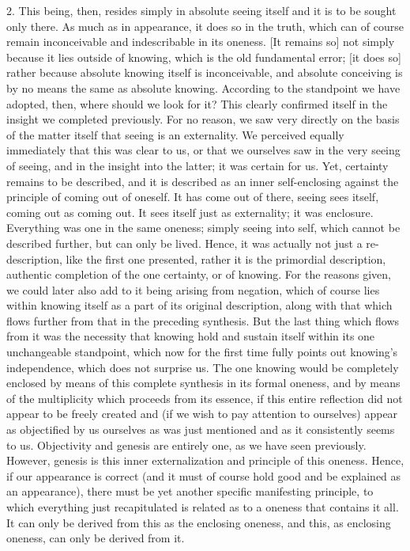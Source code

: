 2. This being, then, resides simply
in absolute seeing itself
and it is to be sought only there.
As much as in appearance,
it does so in the truth,
which can of course remain
inconceivable and indescribable
in its oneness.
[It remains so] not simply because
it lies outside of knowing,
which is the old fundamental error;
[it does so] rather because
absolute knowing itself is inconceivable,
and absolute conceiving is by no means
the same as absolute knowing.
According to the standpoint we have adopted, then,
where should we look for it?
This clearly confirmed itself
in the insight we completed previously.
For no reason, we saw very directly
on the basis of the matter itself
that seeing is an externality.
We perceived equally immediately
that this was clear to us,
or that we ourselves saw
in the very seeing of seeing,
and in the insight into the latter;
it was certain for us.
Yet, certainty remains to be described,
and it is described as an inner self-enclosing
against the principle of coming out of oneself.
It has come out of there, seeing sees itself,
coming out as coming out.
It sees itself just as externality;
it was enclosure.
Everything was one in the same oneness;
simply seeing into self,
which cannot be described further,
but can only be lived.
Hence, it was actually not just a re-description,
like the first one presented,
rather it is the primordial description,
authentic completion of the one certainty, or of knowing.
For the reasons given, we could later also
add to it being arising from negation,
which of course lies within knowing itself
as a part of its original description,
along with that which flows further
from that in the preceding synthesis.
But the last thing which flows from it was
the necessity that knowing hold and sustain itself
within its one unchangeable standpoint,
which now for the first time fully
points out knowing's independence,
which does not surprise us.
The one knowing would be completely enclosed
by means of this complete
synthesis in its formal oneness,
and by means of the multiplicity
which proceeds from its essence,
if this entire reflection did not appear
to be freely created and
(if we wish to pay attention to ourselves)
appear as objectified by us ourselves as was
just mentioned and as it consistently seems to us.
Objectivity and genesis are entirely one,
as we have seen previously.
However, genesis is this inner
externalization and principle of this oneness.
Hence, if our appearance is correct
(and it must of course hold good
and be explained as an appearance),
there must be yet another
specific manifesting principle,
to which everything just recapitulated is related
as to a oneness that contains it all.
It can only be derived from this
as the enclosing oneness,
and this, as enclosing oneness,
can only be derived from it.

